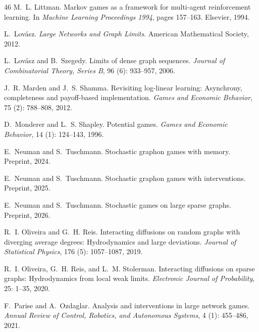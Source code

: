 \documentclass[11pt]{article}
\numberwithin{equation}{section}
\begin{document}
\begin{thebibliography}{46}
M.~L. Littman.
\newblock Markov games as a framework for multi-agent reinforcement learning.
\newblock In \emph{Machine Learning Proceedings 1994}, pages 157--163.
  Elsevier, 1994.

L.~Lov{\'a}sz.
\newblock \emph{Large Networks and Graph Limits}.
\newblock American Mathematical Society, 2012.

L.~Lov{\'a}sz and B.~Szegedy.
\newblock Limits of dense graph sequences.
\newblock \emph{Journal of Combinatorial Theory, Series B}, 96
  (6): 933--957, 2006.

J.~R. Marden and J.~S. Shamma.
\newblock Revisiting log-linear learning: {A}synchrony, completeness and
  payoff-based implementation.
\newblock \emph{Games and Economic Behavior}, 75 (2):
  788--808, 2012.

D.~Monderer and L.~S. Shapley.
\newblock Potential games.
\newblock \emph{Games and Economic Behavior}, 14 (1):
  124--143, 1996.

E.~Neuman and S.~Tuschmann.
\newblock Stochastic graphon games with memory.
\newblock Preprint, 2024.

E.~Neuman and S.~Tuschmann.
\newblock Stochastic graphon games with interventions.
\newblock Preprint, 2025.

E.~Neuman and S.~Tuschmann.
\newblock Stochastic games on large sparse graphs.
\newblock Preprint, 2026.

R.~I. Oliveira and G.~H. Reis.
\newblock Interacting diffusions on random graphs with diverging average
  degrees: Hydrodynamics and large deviations.
\newblock \emph{Journal of Statistical Physics}, 176 (5):
  1057--1087, 2019.

R.~I. Oliveira, G.~H. Reis, and L.~M. Stolerman.
\newblock Interacting diffusions on sparse graphs: Hydrodynamics from local
  weak limits.
\newblock \emph{Electronic Journal of Probability}, 25: 1--35, 2020.

F.~Parise and A.~Ozdaglar.
\newblock Analysis and interventions in large network games.
\newblock \emph{Annual Review of Control, Robotics, and Autonomous Systems},
  4 (1): 455--486, 2021.


\end{thebibliography}
\end{document}
